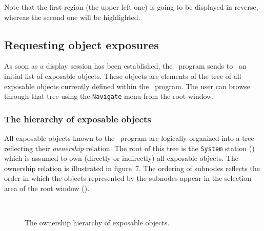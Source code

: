 Note that the first region (the upper left one) is going to be displayed
in reverse, whereas the second one will be highlighted.

\subsection{Requesting object exposures}
\label{rm_ds_om}

As soon as a display session has been established, the \smurph\ program sends
to \dsd\ an initial list of exposable objects.
These objects are elements of the tree of all exposable objects currently
defined within the \smurph\ program.
The user can browse through that tree using the {\tt Navigate} menu
from the root window.

\subsubsection{The hierarchy of exposable objects}
\label{rm_ds_om_oh}

All exposable objects known to the \smurph\ program are logically organized
into a tree reflecting their {\em ownership\/} relation.
The root of this tree is the {\tt System} station ()
which is assumed to own (directly or indirectly) all exposable objects.
The ownership relation is illustrated in
figure~7.
The ordering of subnodes reflects the order in which the objects represented
by the subnodes appear in the selection area of the root window
().

\begin{figure}
\begin{center}
\ 
\caption{The ownership hierarchy of exposable objects.}%
\end{center}
\end{figure}

